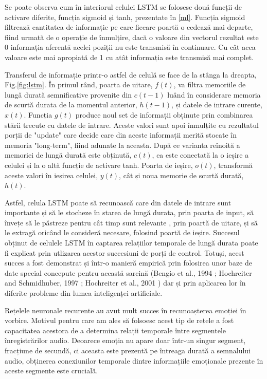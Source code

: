 \documentclass[a4paper,12pt]{book}
\begin{document}
				Se poate observa cum în interiorul celulei LSTM se folosesc două funcții de activare diferite, funcția sigmoid și tanh, prezentate în \ref{ml}. Funcția sigmoid filtrează cantitatea de informație pe care fiecare poartă o cedează mai departe, fiind urmată de o operație de înmulțire, dacă o valoare din vectorul rezultat este 0 informația aferentă acelei poziții nu este transmisă în continuare. Cu cât acea valoare este mai apropiată de 1 cu atât informația este transmisă mai complet. \par
				Transferul de informație printr-o astfel de celulă se face de la stânga la dreapta, Fig.\ref{fig:lstm}. În primul rând, poarta de uitare, $f(t)$, va filtra memoriile de lungă durată semnificative provenite din $c(t-1)$ luând în considerare memoria de scurtă durata de la momentul anterior, $h(t-1)$, și datele de intrare curente, $x(t)$. Funcția $g(t)$ produce noul set de informații obținute prin combinarea stării trecute cu datele de intrare. Aceste valori sunt apoi înmulțite cu rezultatul porții de "update" care decide care din aceste informații merită stocate în memoria "long-term", fiind adunate la aceasta. După ce varianta reînoită a memoriei de lungă durată este obținută, $c(t)$, ea este conectată la o ieșire a celulei și la o altă funcție de activare tanh. Poarta de ieșire, $o(t)$, transformă aceste valori în ieșirea celulei, $y(t)$, cât și noua memorie de scurtă durată, $h(t)$. \par
				
				Astfel, celula LSTM poate să recunoască care din datele de intrare sunt importante și să le stocheze în starea de lungă durata, prin poarta de input, să învețe să le păstreze pentru cât timp sunt relevante , prin poartă de uitare, și să le extragă oricând le consideră necesare, folosind poartă de ieșire. Succesul obținut de celulele LSTM în captarea relațiilor temporale de lungă durata poate fi explicat prin utlizarea acestor succesiuni de porți de control. Totuși, acest succes a fost demonstrat și într-o manieră empirică prin folosirea unor baze de date special concepute pentru această sarcină (Bengio et al., 1994 \cite{rnn3}; Hochreiter and Schmidhuber, 1997 \cite{rnn4}; Hochreiter et al., 2001 \cite{rnn5}) dar și prin aplicarea lor în diferite probleme din lumea inteligenței artificiale. \par
				
				Rețelele neuronale recurente au avut mult succes în recunoașterea emoției în vorbire. Motivul pentru care am ales să folsoesc acest tip de rețele a fost capacitatea acestora de a determina relații temporale între segmentele înregistrărilor audio. Deoarece emoția nu apare doar într-un singur segment, fracțiune de secundă, ci aceasta este prezentă pe întreaga durată a semnalului audio, obținerea  conexiunilor temporale dintre informațiile emoționale prezente în aceste segmente este crucială. 
				
\end{document}
